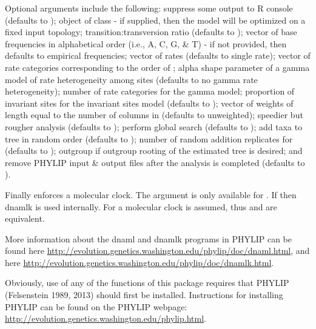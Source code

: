 \documentclass[a4paper]{book}
\begin{document}
\begin{Details}\relax
Optional arguments include the following:  suppress some output to R console (defaults to );  object of class  - if supplied, then the model will be optimized on a fixed input topology;  transition:transversion ratio (defaults to );  vector of base frequencies in alphabetical order (i.e., A, C, G, \& T) - if not provided, then defaults to empirical frequencies;  vector of rates (defaults to single rate);  vector of rate categories corresponding to the order of ;  alpha shape parameter of a gamma model of rate heterogeneity among sites (defaults to no gamma rate heterogeneity);  number of rate categories for the gamma model;  proportion of invariant sites for the invariant sites model (defaults to );  vector of weights of length equal to the number of columns in  (defaults to unweighted);  speedier but rougher analysis (defaults to );  perform global search (defaults to );  add taxa to tree in random order (defaults to );  number of random addition replicates for  (defaults to );  outgroup if outgroup rooting of the estimated tree is desired; and  remove PHYLIP input \& output files after the analysis is completed (defaults to ).

Finally  enforces a molecular clock. The argument  is only available for . If  then dnamlk is used internally. For  a molecular clock is assumed, thus  and  are equivalent.

More information about the dnaml and dnamlk programs in PHYLIP can be found here \url{http://evolution.genetics.washington.edu/phylip/doc/dnaml.html}, and here \url{http://evolution.genetics.washington.edu/phylip/doc/dnamlk.html}.

Obviously, use of any of the functions of this package requires that PHYLIP (Felsenstein 1989, 2013) should first be installed. Instructions for installing PHYLIP can be found on the PHYLIP webpage: \url{http://evolution.genetics.washington.edu/phylip.html}.
\end{Details}
\end{document}

